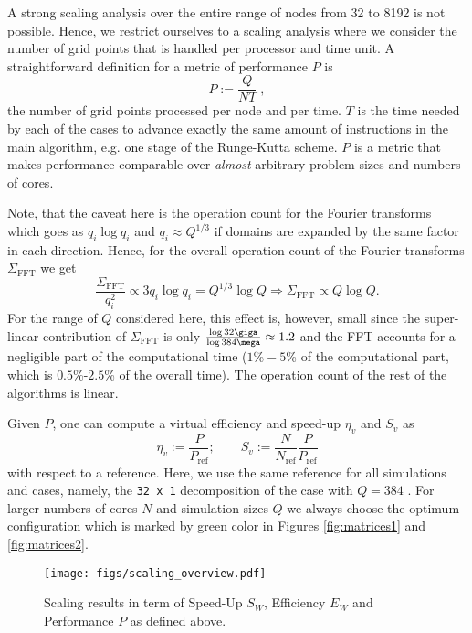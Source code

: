 A strong scaling analysis over the entire range of nodes from 32 to 8192 is not
possible. Hence, we restrict ourselves to a scaling analysis where we consider
the number of grid points that is handled per processor and time unit. A
straightforward definition for a metric of performance $P$ is
\begin{equation}
  P:=\frac{Q}{N T} \;,
\end{equation}
the number of grid points processed per node and per time. $T$ is the time
needed by each of the cases to advance exactly the same amount of instructions
in the main algorithm, e.g. one stage of the Runge-Kutta scheme. $P$ is a metric
that makes performance comparable over \textit{almost} arbitrary problem sizes
and numbers of cores.

Note, that the caveat here is the operation count for the Fourier transforms
which goes as $q_i \log q_i$ and $q_i \approx Q^{1/3}$ if domains are expanded
by the same factor in each direction. Hence, for the overall operation count of
the Fourier transforms $\Sigma_\mathrm{FFT}$ we get
\begin{equation}
\frac{\Sigma_{\mathrm{FFT}}}{q_{i}^{2}}\propto 3 q_i \log q_i = Q^{1/3} \log
Q\Rightarrow \Sigma_\mathrm{FFT}\propto Q\log Q.
\end{equation}
For the range of $Q$ considered here, this effect is, however, small since the
super-linear contribution of $\Sigma_\mathrm{FFT}$ is only $\frac{\log 32\giga
}{\log 384\mega} \approx 1.2$ and the FFT accounts for a negligible part of the
computational time ($1\%-5$\% of the computational part, which is
$0.5$\%-$2.5$\% of the overall time).  The operation count of the rest of the
algorithms is linear.

Given $P$, one can compute a virtual efficiency and speed-up $\eta_v$ and $S_v$ as
\begin{equation}
\eta_v:=\frac{P}{P_\mathrm{ref}}; \qquad S_v:=\frac{N}{N_\mathrm{ref}}\frac{P}{P_\mathrm{ref}}
\end{equation}
with respect to a reference. Here, we use the same reference for all simulations
and cases, namely, the \texttt{32 x 1} decomposition of the case with
$Q=384$ \mega. For larger numbers of cores $N$ and simulation sizes $Q$ we
always choose the optimum configuration which is marked by green color in
Figures \ref{fig:matrices1} and \ref{fig:matrices2}.

\begin{figure}
\begin{centering}
\texttt{[image: figs/scaling\_overview.pdf]}
\end{centering}
\caption{Scaling results in term of Speed-Up $S_W$, Efficiency $E_W$ and
Performance $P$ as defined above.}
\label{fig:v_scaling1}
\end{figure}

